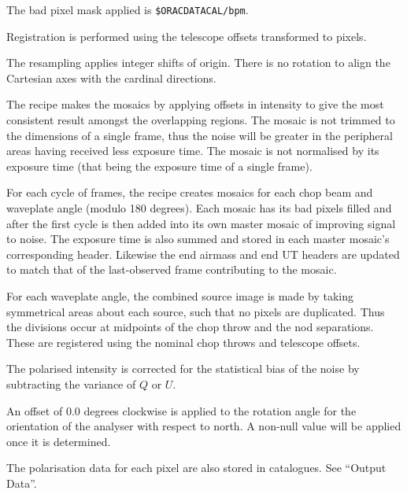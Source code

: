 \documentclass[twoside,11pt]{article}
\newcommand{\htmlref}[2]{#1}
\renewcommand{\_}{\texttt{\symbol{95}}}
\newcommand{\sstitem}{\item}
\begin{document}
{{{         \sstitem
         The bad pixel mask applied is {\tt\$ORAC\_DATA\_CAL/bpm}.

         \sstitem
         Registration is performed using the telescope offsets
         transformed to pixels.

         \sstitem
         The resampling applies integer shifts of origin.   There is no
         rotation to align the Cartesian axes with the cardinal directions.

         \sstitem
         The recipe makes the mosaics by applying offsets in intensity
         to give the most consistent result amongst the overlapping regions.
         The mosaic is not trimmed to the dimensions of a single frame, thus
         the noise will be greater in the peripheral areas having received
         less exposure time.  The mosaic is not normalised by its exposure
         time (that being the exposure time of a single frame).

         \sstitem
         For each cycle of frames, the recipe creates mosaics for each
         chop beam and waveplate angle (modulo 180 degrees).  Each mosaic
         has its bad pixels filled and after the first cycle is then added
         into its own master mosaic of improving signal to noise.  The
         exposure time is also summed and stored in each master mosaic's
         corresponding header.  Likewise the end airmass and end UT headers
         are updated to match that of the last-observed frame contributing
         to the mosaic.

         \sstitem
         For each waveplate angle, the combined source image is made by
         taking symmetrical areas about each source, such that no pixels
         are duplicated.  Thus the divisions occur at midpoints of the chop
         throw and the nod separations.  These are registered using the
         nominal chop throws and telescope offsets.

         \sstitem
         The polarised intensity is corrected for the statistical bias
         of the noise by subtracting the variance of $Q$ or $U$.

         \sstitem
         An offset of 0.0 degrees clockwise is applied to the rotation
         angle for the orientation of the analyser with respect to north.
         A non-null value will be applied once it is determined.

         \sstitem
         The polarisation data for each pixel are also stored in
         catalogues.  See \htmlref{``Output Data''}{pqfnc_data}.

}}}
\end{document}
